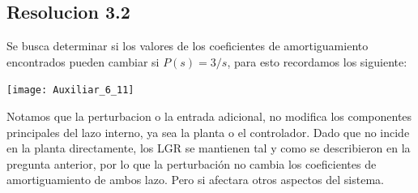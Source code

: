 \documentclass[
  11pt,
  letterpaper,
   addpoints,
   answers
  ]{exam}
\begin{document}
\begin{questions}
\begin{solution}
\subsection*{Resolucion 3.2}
Se busca determinar si los valores de los coeficientes de amortiguamiento encontrados pueden cambiar si $P(s) = 3/s$, para esto recordamos los siguiente:
\begin{center}
    \texttt{[image: Auxiliar\_6\_11]}
\end{center}
Notamos que la perturbacion o la entrada adicional,  no modifica los componentes principales del lazo interno, ya sea la planta o el controlador. Dado que no incide en la planta directamente, los LGR se mantienen tal y como se describieron en la pregunta anterior, por lo que la perturbación no cambia los coeficientes de amortiguamiento de ambos lazo. Pero si afectara otros aspectos del sistema.

\end{solution}
\end{questions}
\end{document}
